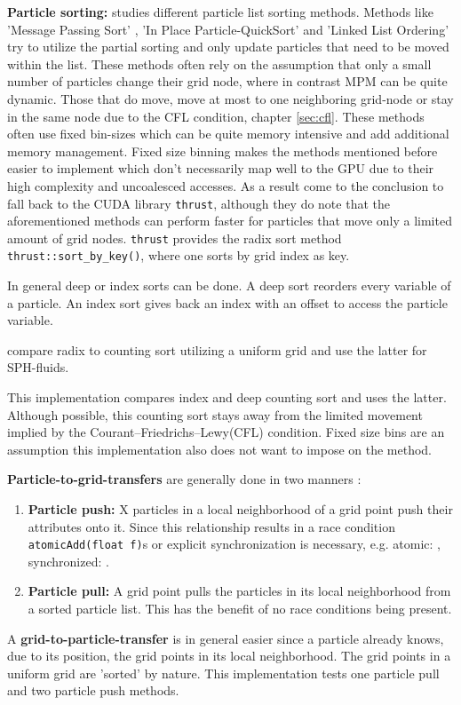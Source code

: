 \documentclass[m,times]{cgMA}
\begin{document}
\textbf{Particle sorting:} \cite{PIC:GPU} studies different particle list sorting methods. Methods like 'Message Passing Sort' \cite{kong2011particle} \cite{decyk2011adaptable}, 'In Place Particle-QuickSort' \cite{stantchev2008fast} and 'Linked List Ordering' \cite{burau2010picongpu} try to utilize the partial sorting and only update particles that need to be moved within the list. These methods often rely on the assumption that only a small number of particles change their grid node, where in contrast MPM can be quite dynamic. Those that do move, move at most to one neighboring grid-node or stay in the same node due to the CFL condition, chapter \ref{sec:cfl}. These methods often use fixed bin-sizes which can be quite memory intensive and add additional memory management. Fixed size binning makes the methods mentioned before easier to implement which don't necessarily map well to the GPU due to their high complexity and uncoalesced accesses. As a result \cite{PIC:GPU} come to the conclusion to fall back to the CUDA library \texttt{thrust}, although they do note that the aforementioned methods can perform faster for particles that move only a limited amount of grid nodes. \texttt{thrust} provides the radix sort method \texttt{thrust::sort\_by\_key()}, where one sorts by grid index as key.

In general deep or index sorts can be done. A deep sort reorders every variable of a particle. An index sort gives back an index with an offset to access the particle variable.

\cite{NVIDIA:NNSEARCH} compare radix to counting sort utilizing a uniform grid and use the latter for SPH-fluids.

This implementation compares index and deep counting sort and uses the latter. Although possible, this counting sort stays away from the limited movement implied by the Courant–Friedrichs–Lewy(CFL) condition. Fixed size bins are an assumption this implementation also does not want to impose on the method.

\textbf{Particle-to-grid-transfers} are generally done in two manners \cite{stantchev2008fast}:
\begin{enumerate}
  \item \textbf{Particle push:} X particles in a local neighborhood of a grid point push their attributes onto it. Since this relationship results in a race condition \texttt{atomicAdd(float f)}s or explicit synchronization is necessary, e.g. a\-tomic: \cite{PIC:GPU}, synchronized: \cite{FRANCESCO:ROSSI}.
  \item \textbf{Particle pull:} A grid point pulls the particles in its local neighborhood from a sorted particle list. This has the benefit of no race conditions being present.
\end{enumerate}
A \textbf{grid-to-particle-transfer} is in general easier since a particle already knows, due to its position, the grid points in its local neighborhood. The grid points in a uniform grid are 'sorted' by nature. This implementation tests one particle pull and two particle push methods.
\end{document}
